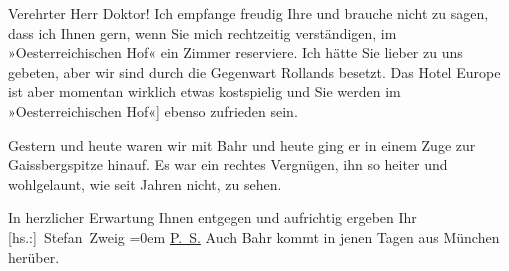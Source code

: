 \pstart\center{}Verehrter Herr Doktor!\pend\vspace{0.5em}
\pstart
           Ich empfange freudig Ihre \label{K_L03686-1v}\label{K_L03686-1} und brauche nicht zu sagen, dass ich Ihnen gern,
               wenn Sie mich rechtzeitig verständigen, im »Oesterreichischen Hof« ein Zimmer reserviere. Ich hätte Sie lieber zu uns
               gebeten, aber wir sind durch die Gegenwart Rollands besetzt. Das Hotel Europe
               ist aber momentan wirklich etwas kostspielig und Sie werden im »Oesterreichischen Hof\oindex{Österreichischer Hof@\textbf{Österreichischer Hof}|pw}{[}«{]} ebenso zufrieden sein.\pend
           
\pstart
           Gestern und heute waren wir mit Bahr und heute ging er in einem Zuge zur Gaissbergspitze hinauf. Es war ein rechtes
               Vergnügen, ihn so heiter und wohlgelaunt, wie seit Jahren nicht, zu sehen.\pend
           
\pstart
           In herzlicher Erwartung Ihnen entgegen und aufrichtig ergeben Ihr{\\[\baselineskip]}\spacefill\mbox{{[}hs.:{]} Stefan Zweig}\pend
           \leftskip=0em{}
\pstart
           \noindent{}\uline{P. S.} Auch Bahr kommt in jenen Tagen aus München herüber.\pend
           \endnumbering{}  \newcommand{\dateiname}{L03686}\newcommand{\titel}{Stefan Zweig an Arthur Schnitzler, 28. 7. 1923}\newcommand{\editorInnen}{Selma Jahnke und Martin Anton Müller}
